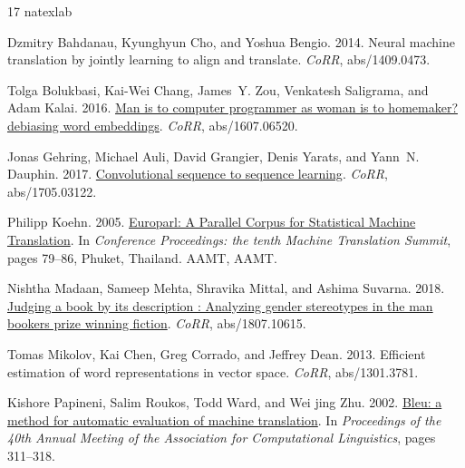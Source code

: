 \documentclass[11pt,a4paper]{article}
\begin{document}
\begin{thebibliography}{17}
\expandafter\ifx\csname natexlab\endcsname\relax\def\natexlab#1{#1}\fi

Dzmitry Bahdanau, Kyunghyun Cho, and Yoshua Bengio. 2014.
\newblock Neural machine translation by jointly learning to align and
  translate.
\newblock \emph{CoRR}, abs/1409.0473.

Tolga Bolukbasi, Kai{-}Wei Chang, James~Y. Zou, Venkatesh Saligrama, and Adam
  Kalai. 2016.
\newblock \href {http://arxiv.org/abs/1607.06520} {Man is to computer
  programmer as woman is to homemaker? debiasing word embeddings}.
\newblock \emph{CoRR}, abs/1607.06520.

Jonas Gehring, Michael Auli, David Grangier, Denis Yarats, and Yann~N. Dauphin.
  2017.
\newblock \href {http://arxiv.org/abs/1705.03122} {Convolutional sequence to
  sequence learning}.
\newblock \emph{CoRR}, abs/1705.03122.

Philipp Koehn. 2005.
\newblock \href {http://mt-archive.info/MTS-2005-Koehn.pdf} {{Europarl: A
  Parallel Corpus for Statistical Machine Translation}}.
\newblock In \emph{{Conference Proceedings: the tenth Machine Translation
  Summit}}, pages 79--86, Phuket, Thailand. AAMT, AAMT.

Nishtha Madaan, Sameep Mehta, Shravika Mittal, and Ashima Suvarna. 2018.
\newblock \href {http://arxiv.org/abs/1807.10615} {Judging a book by its
  description : Analyzing gender stereotypes in the man bookers prize winning
  fiction}.
\newblock \emph{CoRR}, abs/1807.10615.

Tomas Mikolov, Kai Chen, Greg Corrado, and Jeffrey Dean. 2013.
\newblock Efficient estimation of word representations in vector space.
\newblock \emph{CoRR}, abs/1301.3781.

Kishore Papineni, Salim Roukos, Todd Ward, and Wei jing Zhu. 2002.
\newblock \href {http://aclweb.org/anthology/P02-1040} {Bleu: a method for
  automatic evaluation of machine translation}.
\newblock In \emph{Proceedings of the 40th Annual Meeting of the Association
  for Computational Linguistics}, pages 311--318.


\end{thebibliography}
\end{document}
